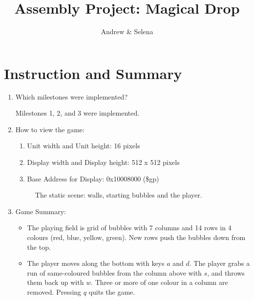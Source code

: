 \documentclass{article}
\title{Assembly Project: Magical Drop}
\author{Andrew & Selena}
\begin{document}
\maketitle

\section{Instruction and Summary}

\begin{enumerate}

    \item Which milestones were implemented? 
    
    Milestones 1, 2, and 3 were implemented.

    \item How to view the game:
    
    \begin{enumerate}

    \item Unit width and Unit height: 16 pixels
    \item Display width and Display height: 512 x 512 pixels
    \item Base Address for Display:   0x10008000 (\$gp)


    \end{enumerate}

\begin{figure}[ht!]
    \centering
    \caption{The static scene: walls, starting bubbles and the player.}
    \label{fig:static}
\end{figure}

\item Game Summary:
\begin{itemize}
\item The playing field is grid of bubbles with 7 columns and 14 rows in 4 colours (red, blue, yellow, green). New rows push the bubbles down from the top.
\item The player moves along the bottom with keys $a$ and $d$. The player grabs a run of same-coloured bubbles from the column above with $s$, and throws them back up with $w$. Three or more of one colour in a column are removed. Pressing $q$ quits the game.
\end{itemize}

    
\end{enumerate}
\end{document}

